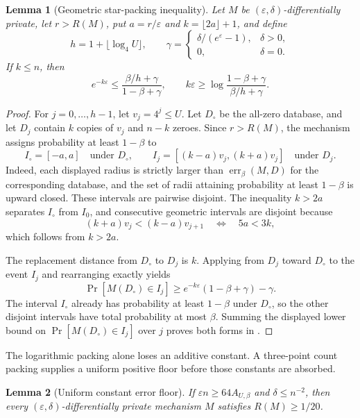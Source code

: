 \documentclass[11pt]{article}
\newtheorem{lemma}{Lemma}[section]
\begin{document}
\begin{lemma}[Geometric star-packing inequality]
\label{lem:star-packing}
Let $M$ be $(\varepsilon,\delta)$-differentially private, let $r>R(M)$, put
$a=r/\varepsilon$ and $k=\lfloor2a\rfloor+1$, and define
\[
 h=1+\lfloor\log_4U\rfloor,
 \qquad
 \gamma=
 \begin{cases}
  \delta/(e^\varepsilon-1),&\delta>0,\\
  0,&\delta=0.
 \end{cases}
\]
If $k\le n$, then
\begin{equation}
 e^{-k\varepsilon}
 \le\frac{\beta/h+\gamma}{1-\beta+\gamma},
 \qquad
 k\varepsilon
 \ge\log\frac{1-\beta+\gamma}{\beta/h+\gamma}.
 \label{eq:exact-star}
\end{equation}
\end{lemma}

\begin{proof}
For $j=0,\ldots,h-1$, let $v_j=4^j\le U$.  Let $D_\circ$ be the all-zero
database, and let $D_j$ contain $k$ copies of $v_j$ and $n-k$ zeroes.  Since
$r>R(M)$, the mechanism assigns probability at least $1-\beta$ to
\[
 I_\circ=[-a,a]
 \quad\text{under }D_\circ,
 \qquad
 I_j=[(k-a)v_j,(k+a)v_j]
 \quad\text{under }D_j.
\]
Indeed, each displayed radius is strictly larger than
$\operatorname{err}_{\beta}(M,D)$ for the corresponding database, and the
set of radii attaining probability at least $1-\beta$ is upward closed.
These intervals are pairwise disjoint.  The inequality $k>2a$ separates
$I_\circ$ from $I_0$, and consecutive geometric intervals are disjoint
because
\[
 (k+a)v_j<(k-a)v_{j+1}
 \quad\Longleftrightarrow\quad 5a<3k,
\]
which follows from $k>2a$.

The replacement distance from $D_\circ$ to $D_j$ is $k$.  Applying
 from $D_j$ toward $D_\circ$ to the event $I_j$
and rearranging exactly yields
\[
 \Pr[M(D_\circ)\in I_j]
 \ge e^{-k\varepsilon}(1-\beta+\gamma)-\gamma.
\]
The interval $I_\circ$ already has probability at least $1-\beta$ under
$D_\circ$, so the other disjoint intervals have total probability at most
$\beta$.  Summing the displayed lower bound on
$\Pr[M(D_\circ)\in I_j]$ over $j$ proves both forms in
.
\end{proof}

The logarithmic packing alone loses an additive constant.  A three-point
count packing supplies a uniform positive floor before those constants are
absorbed.

\begin{lemma}[Uniform constant error floor]
\label{lem:constant-floor}
If $\varepsilon n\ge64A_{U,\beta}$ and $\delta\le n^{-2}$, then every
$(\varepsilon,\delta)$-differentially private mechanism $M$ satisfies
$R(M)\ge1/20$.
\end{lemma}
\end{document}
